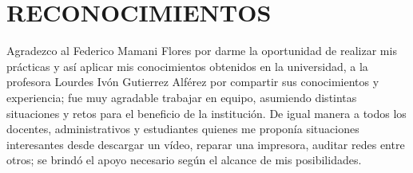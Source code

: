\pagestyle{empty}

\chapter*{RECONOCIMIENTOS}

Agradezco al Federico Mamani Flores por darme la oportunidad de realizar mis prácticas y así aplicar mis conocimientos obtenidos en la universidad, a la profesora Lourdes Ivón Gutierrez Alférez por compartir sus conocimientos y experiencia; fue muy agradable trabajar en equipo, asumiendo distintas situaciones y retos para el beneficio de la institución. De igual manera a todos los docentes, administrativos y estudiantes quienes me proponía situaciones interesantes desde descargar un vídeo, reparar una impresora, auditar redes entre otros; se brindó el apoyo necesario según el alcance de mis posibilidades.

\thispagestyle{empty}